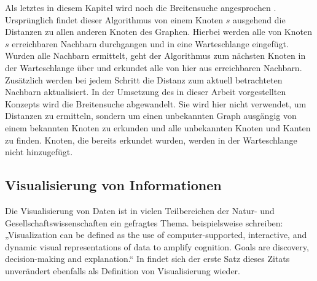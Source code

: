 \documentclass[12pt, a4paper]{article}
\begin{document}
Als letztes in diesem Kapitel wird noch die Breitensuche angesprochen \cite[S. 92f]{bang2008digraphs}. Ursprünglich findet dieser Algorithmus von einem Knoten $s$ ausgehend die Distanzen zu allen anderen Knoten des Graphen. Hierbei werden alle von Knoten $s$ erreichbaren Nachbarn durchgangen und in eine Warteschlange eingefügt. Wurden alle Nachbarn ermittelt, geht der Algorithmus zum nächsten Knoten in der Warteschlange über und erkundet alle von hier aus erreichbaren Nachbarn. Zusätzlich werden bei jedem Schritt die Distanz zum aktuell betrachteten Nachbarn aktualisiert. In der Umsetzung des in dieser Arbeit vorgestellten Konzepts wird die Breitensuche abgewandelt. Sie wird hier nicht verwendet, um Distanzen zu ermitteln, sondern um einen unbekannten Graph ausgängig von einem bekannten Knoten zu erkunden und alle unbekannten Knoten und Kanten zu finden. Knoten, die bereits erkundet wurden, werden in der Warteschlange nicht hinzugefügt.\\

\newpage
\subsection{Visualisierung von Informationen}
Die Visualisierung von Daten ist in vielen Teilbereichen der Natur- und Gesellschaftswissenschaften ein gefragtes Thema.  beispielsweise schreiben: „Visualization can be defined as the use of computer-supported, interactive, and dynamic visual representations of data to amplify cognition. Goals are discovery, decision-making and explanation.“ In  findet sich der erste Satz dieses Zitats unverändert ebenfalls als Definition von Visualisierung wieder.\\
\end{document}
